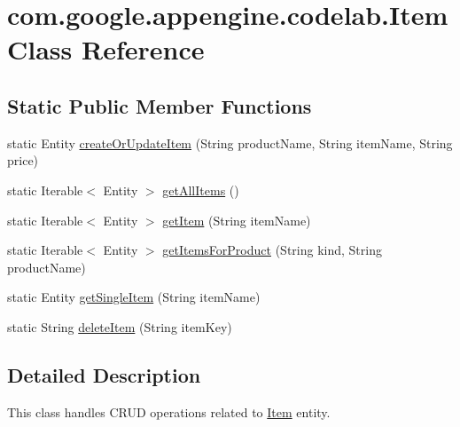 \hypertarget{classcom_1_1google_1_1appengine_1_1codelab_1_1_item}{\section{com.\-google.\-appengine.\-codelab.\-Item Class Reference}
\label{classcom_1_1google_1_1appengine_1_1codelab_1_1_item}
}
\subsection*{Static Public Member Functions}
\begin{DoxyCompactItemize}
\item 
static Entity \hyperlink{classcom_1_1google_1_1appengine_1_1codelab_1_1_item_a1f0cd1ed3e9e496f6cd40cde580dc045}{create\-Or\-Update\-Item} (String product\-Name, String item\-Name, String price)
\item 
static Iterable$<$ Entity $>$ \hyperlink{classcom_1_1google_1_1appengine_1_1codelab_1_1_item_ac34c1a67f0b499b88f2ba10c9c57d9d5}{get\-All\-Items} ()
\item 
static Iterable$<$ Entity $>$ \hyperlink{classcom_1_1google_1_1appengine_1_1codelab_1_1_item_a03e5b5b5ebc360327091c946c6b7874d}{get\-Item} (String item\-Name)
\item 
static Iterable$<$ Entity $>$ \hyperlink{classcom_1_1google_1_1appengine_1_1codelab_1_1_item_a1c221deafdbd13c4133edf24cb6dcdb8}{get\-Items\-For\-Product} (String kind, String product\-Name)
\item 
static Entity \hyperlink{classcom_1_1google_1_1appengine_1_1codelab_1_1_item_addfefc24274a9ae1e62dc123e4bc2a68}{get\-Single\-Item} (String item\-Name)
\item 
static String \hyperlink{classcom_1_1google_1_1appengine_1_1codelab_1_1_item_a43b58e542f3362d9d1f3c35cc0d27d4d}{delete\-Item} (String item\-Key)
\end{DoxyCompactItemize}


\subsection{Detailed Description}
This class handles C\-R\-U\-D operations related to \hyperlink{classcom_1_1google_1_1appengine_1_1codelab_1_1_item}{Item} entity. 

